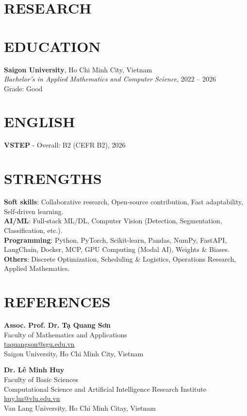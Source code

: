 \documentclass[margin]{res}
\begin{document}
\begin{resume}
\section{RESEARCH}
\nocite{*}
\printbibliography[heading=none]

  \section{EDUCATION}
  \textbf{Saigon University}, Ho Chi Minh City, Vietnam \\
  {\sl Bachelor's in Applied Mathematics and Computer Science}, 2022 -- 2026\\
  Grade: Good

  \section{ENGLISH}
  \textbf{VSTEP} - Overall: B2 (CEFR B2), 2026

  \section{STRENGTHS}
  \textbf{Soft skills}: Collaborative research, Open-source contribution, Fast adaptability, Self-driven learning.
  \\
  \textbf{AI/ML}: Full-stack ML/DL, Computer Vision (Detection, Segmentation, Classification, etc.).
  \\
  \textbf{Programming}: Python, PyTorch, Scikit-learn, Pandas, NumPy, FastAPI, LangChain, Docker, MCP, GPU Computing (Modal AI), Weights \& Biases.
  \\
  \textbf{Others}: Discrete Optimization, Scheduling \& Logistics, Operations Research, Applied Mathematics.

  \section{REFERENCES}
  \textbf{Assoc. Prof. Dr. Tạ Quang Sơn}\\
  Faculty of Mathematics and Applications\\
  \href{mailto:taquangson@sgu.edu.vn}{taquangson@sgu.edu.vn}\\
  Saigon University, Ho Chi Minh City, Vietnam

  \par
  \textbf{Dr. Lê Minh Huy}\\
  Faculty of Basic Sciences\\
  Computational Science and Artificial Intelligence Research Institute\\
  \href{mailto:huy.lm@vlu.edu.vn}{huy.lm@vlu.edu.vn}\\
  Van Lang University, Ho Chi Minh Citay, Vietnam


\end{resume}
\end{document}
